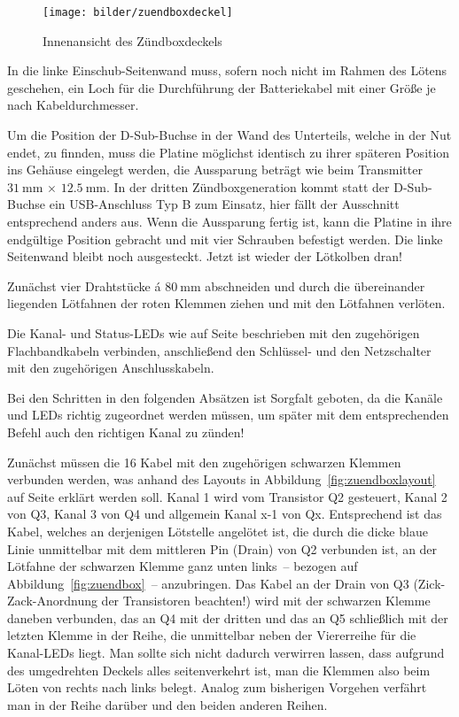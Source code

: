 \documentclass[paper=a4, parskip, numbers=noenddot, toc=listof, headsepline]{scrbook}
\begin{document}
				\begin{figure}
					\centering
					\texttt{[image: bilder/zuendboxdeckel]}
					\caption{Innenansicht des Zündboxdeckels}
					\label{fig:zuendboxdeckel}
				\end{figure}

				In die linke Einschub-Seitenwand muss, sofern noch nicht im Rahmen des Lötens geschehen, ein Loch für die Durchführung der Batteriekabel mit einer Größe je nach Kabeldurchmesser.

				Um die Position der D-Sub-Buchse in der Wand des Unterteils, welche in der Nut endet, zu finnden, muss die Platine möglichst identisch zu ihrer späteren Position ins Gehäuse eingelegt werden, die Aussparung beträgt wie beim Transmitter $\SI{31}{\milli\metre}\,\times\,\SI{12,5}{\milli\metre}$. In der dritten Zündboxgeneration kommt statt der D-Sub-Buchse ein USB-Anschluss Typ B zum Einsatz, hier fällt der Ausschnitt entsprechend anders aus. Wenn die Aussparung fertig ist, kann die Platine in ihre endgültige Position gebracht und mit vier Schrauben befestigt werden. Die linke Seitenwand bleibt noch ausgesteckt. Jetzt ist wieder der Lötkolben dran!

				Zunächst vier Drahtstücke á $\SI{80}{\milli\metre}$ abschneiden und durch die übereinander liegenden Lötfahnen der roten Klemmen ziehen und mit den Lötfahnen verlöten.

				Die Kanal- und Status-LEDs wie auf Seite \pageref{enum:leds} beschrieben mit den zugehörigen Flachbandkabeln verbinden, anschließend den Schlüssel- und den Netzschalter mit den zugehörigen Anschlusskabeln.

				Bei den Schritten in den folgenden Absätzen ist Sorgfalt geboten, da die Kanäle und LEDs richtig zugeordnet werden müssen, um später mit dem entsprechenden Befehl auch den richtigen Kanal zu zünden!

				Zunächst müssen die 16 Kabel mit den zugehörigen schwarzen Klemmen verbunden werden, was anhand des Layouts in Abbildung~\ref{fig:zuendboxlayout} auf Seite \pageref{fig:zuendboxlayout} erklärt werden soll. Kanal 1 wird vom Transistor Q2 gesteuert, Kanal 2 von Q3, Kanal 3 von Q4 und allgemein Kanal x-1 von Qx. Entsprechend ist das Kabel, welches an derjenigen Lötstelle angelötet ist, die durch die dicke blaue Linie unmittelbar mit dem mittleren Pin (Drain) von Q2 verbunden ist, an der Lötfahne der schwarzen Klemme ganz unten links~-- bezogen auf Abbildung~\ref{fig:zuendbox}~-- anzubringen. Das Kabel an der Drain von Q3 (Zick-Zack-Anordnung der Transistoren beachten!) wird mit der schwarzen Klemme daneben verbunden, das an Q4 mit der dritten und das an Q5 schließlich mit der letzten Klemme in der Reihe, die unmittelbar neben der Viererreihe für die Kanal-LEDs liegt. Man sollte sich nicht dadurch verwirren lassen, dass aufgrund des umgedrehten Deckels alles seitenverkehrt ist, man die Klemmen also beim Löten von rechts nach links belegt. Analog zum bisherigen Vorgehen verfährt man in der Reihe darüber und den beiden anderen Reihen.
\end{document}
